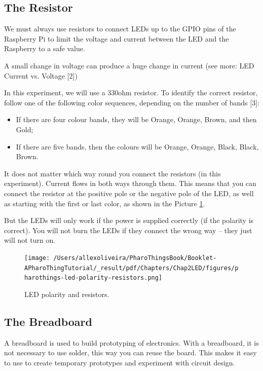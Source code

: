 \documentclass[10pt,twoside,english]{_support/latex/sbabook/sbabook}
\begin{document}
\subsection{The Resistor}
We must always use resistors to connect LEDs up to the GPIO pins of the Raspberry Pi to limit the voltage and current between the LED and the Raspberry to a safe value.

A small change in voltage can produce a huge change in current (see more: LED Current vs. Voltage {[}2{]})

In this experiment, we will use a 330ohm resistor. To identify the correct resistor, follow one of the following color sequences, depending on the number of bands {[}3{]}:

\begin{itemize}
\item If there are four colour bands, they will be Orange, Orange, Brown, and then Gold;
\item If there are five bands, then the colours will be Orange, Orange, Black, Black, Brown.
\end{itemize}

It does not matter which way round you connect the resistors (in this experiment). Current flows in both ways through them. This means that you can connect the resistor at the positive pole or the negative pole of the LED, as well as starting with the first or last color, as shown in the Picture \ref{Ledpolarity}.

But the LEDs will only work if the power is supplied correctly (if the polarity is correct). You will not burn the LEDs if they connect the wrong way – they just will not turn on.


\begin{figure}

\begin{center}
\texttt{[image: /Users/allexoliveira/PharoThingsBook/Booklet-APharoThingTutorial/\_result/pdf/Chapters/Chap2LED/figures/pharothings-led-polarity-resistors.png]}\caption{LED polarity and resistors.\label{Ledpolarity}}\end{center}
\end{figure}

\subsection{The Breadboard}
A breadboard is used to build prototyping of electronics. With a breadboard, it is not necessary to use solder, this way you can reuse the board. This makes it easy to use to create temporary prototypes and experiment with circuit design.
\end{document}
